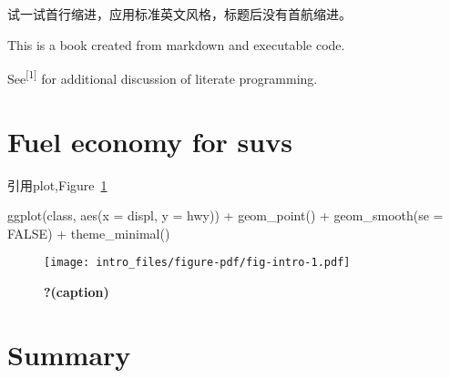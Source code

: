 \documentclass[
  letterpaper,
  DIV=11,
  numbers=noendperiod]{scrreprt}
\newenvironment{Shaded}{}{}
\newcommand{\AttributeTok}[1]{\textcolor[rgb]{0.84,0.23,0.29}{#1}}
\newcommand{\CommentTok}[1]{\textcolor[rgb]{0.42,0.45,0.49}{#1}}
\newcommand{\ConstantTok}[1]{\textcolor[rgb]{0.00,0.36,0.77}{#1}}
\newcommand{\DecValTok}[1]{\textcolor[rgb]{0.00,0.36,0.77}{#1}}
\newcommand{\FunctionTok}[1]{\textcolor[rgb]{0.44,0.26,0.76}{#1}}
\newcommand{\NormalTok}[1]{\textcolor[rgb]{0.14,0.16,0.18}{#1}}
\newcommand{\OtherTok}[1]{\textcolor[rgb]{0.44,0.26,0.76}{#1}}
\newcommand{\SpecialCharTok}[1]{\textcolor[rgb]{0.00,0.36,0.77}{#1}}
\begin{document}
\noindent 试一试首行缩进，应用标准英文风格，标题后没有首航缩进。

This is a book created from markdown and executable code.

See\textsuperscript{{[}1{]}} for additional discussion of literate
programming.

\begin{Shaded}
\end{Shaded}

\hypertarget{fuel-economy-for-suvs}{%
\section{Fuel economy for suvs}\label{fuel-economy-for-suvs}}

引用plot,Figure~\ref{fig-intro}

\begin{Shaded}
\begin{Highlighting}[]
\FunctionTok{ggplot}\NormalTok{(class, }\FunctionTok{aes}\NormalTok{(}\AttributeTok{x =}\NormalTok{ displ, }\AttributeTok{y =}\NormalTok{ hwy)) }\SpecialCharTok{+}
  \FunctionTok{geom\_point}\NormalTok{() }\SpecialCharTok{+}
  \FunctionTok{geom\_smooth}\NormalTok{(}\AttributeTok{se =} \ConstantTok{FALSE}\NormalTok{) }\SpecialCharTok{+}
  \FunctionTok{theme\_minimal}\NormalTok{()}
\end{Highlighting}
\end{Shaded}

\begin{figure}[H]

{\centering \texttt{[image: intro\_files/figure-pdf/fig-intro-1.pdf]}

}

\caption{\label{fig-intro}\textbf{?(caption)}}

\end{figure}

\hypertarget{summary}{%
\section{Summary}\label{summary}}
\end{document}
